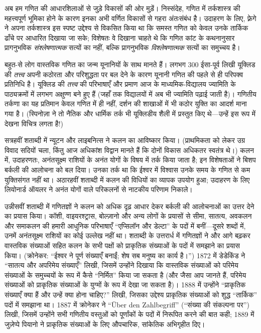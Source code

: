 \documentclass[../../../include/open-logic-section]{subfiles}
\begin{document}
अब हम गणित की आधारशिलाओं से जुड़े विकासों की ओर मुड़ें। निस्संदेह, गणित में
तर्कशास्त्र की महत्त्वपूर्ण भूमिका होने के कारण इनका अभी वर्णित विकासों से
गहरा अंतःसंबंध है। उदाहरण के लिए, फ़्रेगे ने अपना तर्कशास्त्र इस स्पष्ट
उद्देश्य से विकसित किया था कि समस्त गणित को केवल उनके तार्किक ढाँचे पर आधारित
दिखाया जा सके; विशेषतः वे दिखाना चाहते थे कि गणित कांट के कथनानुसार
प्रागनुभविक \emph{संश्लेषणात्मक} सत्यों का नहीं, बल्कि प्रागनुभविक
\emph{विश्लेषणात्मक} सत्यों का समुच्चय है।

बहुत-से लोग वास्तविक गणित का जन्म यूनानियों के साथ मानते हैं। लगभग 300
ईसा-पूर्व लिखी यूक्लिड की \emph{तत्त्व} अपनी कठोरता और परिशुद्धता पर बल देने
के कारण यूनानी गणित की पहले से ही परिपक्व प्रतिनिधि है। यूक्लिड की
\emph{तत्त्व} की परिभाषाएँ और प्रमाण आज के माध्यमिक-विद्यालय ज्यामिति के
पाठ्यक्रमों में लगभग अक्षुण्ण बने हुए हैं (जहाँ तक विद्यालयों में अब भी
ज्यामिति पढ़ाई जाती है)। गणितीय तर्कणा का यह प्रतिमान केवल गणित में ही नहीं,
दर्शन की शाखाओं में भी कठोर युक्ति का आदर्श माना गया है। (स्पिनोज़ा ने तो
नैतिक और धार्मिक तर्क भी यूक्लिडीय शैली में प्रस्तुत किए थे—उन्हें इस रूप में
देखना विचित्र लगता है!)

सत्रहवीं शताब्दी में न्यूटन और लाइबनित्स ने कलन का आविष्कार किया। (प्राथमिकता
को लेकर उग्र विवाद सदियों चला, किंतु आज अधिकांश विद्वान मानते हैं कि दोनों
विकास अधिकतर स्वतंत्र थे।) कलन में, उदाहरणतः, अनंतसूक्ष्म राशियों के अनंत
योगों के विषय में तर्क किया जाता है; इन विशेषताओं ने बिशप बर्कली की आलोचना को
बल दिया। उनका तर्क था कि ईश्वर में विश्वास उनके समय के गणित से कम युक्तिसंगत
नहीं था। अठारहवीं शताब्दी में कलन की विधियों का व्यापक उपयोग हुआ; उदाहरण के
लिए लियोनार्ड ऑयलर ने अनंत योगों वाले परिकलनों से नाटकीय परिणाम निकाले।

उन्नीसवीं शताब्दी में गणितज्ञों ने कलन को अधिक दृढ़ आधार देकर बर्कली की
आलोचनाओं का उत्तर देने का प्रयास किया। कॉशी, वाइयरश्ट्रास, बोल्ज़ानो और अन्य
लोगों के प्रयासों से सीमा, सातत्य, अवकलन और समाकलन की हमारी आधुनिक परिभाषाएँ
``एप्सिलॉन और डेल्टा'' के पदों में बनीं—दूसरे शब्दों में, उनमें अनंतसूक्ष्म
राशियों का कोई उल्लेख नहीं था। शताब्दी के उत्तरार्ध में गणितज्ञों ने और आगे
बढ़कर वास्तविक संख्याओं सहित कलन के सभी पक्षों को प्राकृतिक संख्याओं के
पदों में समझाने का प्रयास किया। (क्रोनेकर: ``ईश्वर ने पूर्ण संख्याएँ बनाईं;
शेष सब मनुष्य का कार्य है।'') 1872 में डेडेकिंड ने ``सातत्य और अपरिमेय
संख्याएँ'' लिखी, जिसमें उन्होंने दिखाया कि वास्तविक संख्याओं को परिमेय
संख्याओं के समुच्चयों के रूप में कैसे ``निर्मित'' किया जा सकता है (और जैसा
आप जानते हैं, परिमेय संख्याओं को प्राकृतिक संख्याओं के युग्मों के रूप में
देखा जा सकता है)। 1888 में उन्होंने ``प्राकृतिक संख्याएँ क्या हैं और उन्हें
क्या होना चाहिए?'' लिखी, जिसका उद्देश्य प्राकृतिक संख्याओं को शुद्ध
``तार्किक'' पदों में समझाना था। 1887 में क्रोनेकर ने ``\"Uber den
Zahlbegriff'' (``संख्या की संकल्पना पर'') लिखी, जिसमें उन्होंने सभी गणितीय
वस्तुओं को पूर्णांकों के पदों में निरूपित करने की बात कही; 1889 में जुज़ेप्पे
पियानो ने प्राकृतिक संख्याओं के लिए औपचारिक, सांकेतिक अभिगृहीत दिए।
\end{document}
